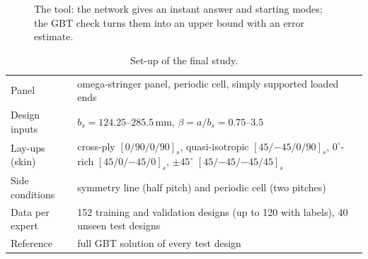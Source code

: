 \documentclass[11pt,a4paper]{article}
\newcommand{\Ncr}{N_{\mathrm{cr}}}
\begin{document}
\begin{figure}[t]
\centering
{}
\caption{The tool: the network gives an instant answer and starting modes; the GBT check turns them into an upper bound with an error estimate.}
\label{fig:tool}
\end{figure}

\begin{table}[t]
\centering\small
\caption{Set-up of the final study.}
\label{tab:setup}
\begin{tabularx}{\textwidth}{@{}lX@{}}
\toprule
Panel & omega-stringer panel, periodic cell, simply supported loaded ends \\
Design inputs & $b_s = 124.25$--$285.5$\,mm, $\beta = a/b_s = 0.75$--$3.5$ \\
Lay-ups (skin) & cross-ply $[0/90/0/90]_s$, quasi-isotropic $[45/{-45}/0/90]_s$, $0^\circ$-rich $[45/0/{-45}/0]_s$, $\pm45^\circ$ $[45/{-45}/{-45}/45]_s$ \\
Side conditions & symmetry line (half pitch) and periodic cell (two pitches) \\
Data per expert & 152 training and validation designs (up to 120 with labels), 40 unseen test designs \\
Reference & full GBT solution of every test design \\
\bottomrule
\end{tabularx}
\end{table}
\end{document}
